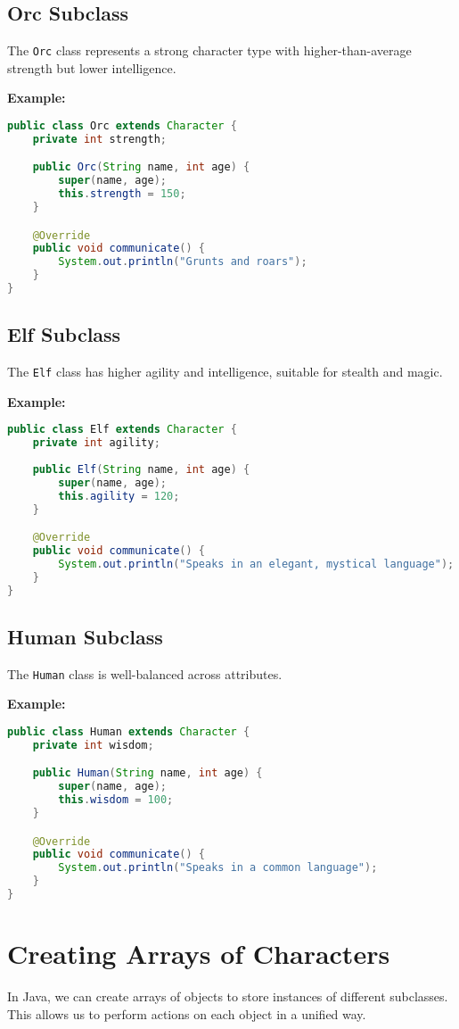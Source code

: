\documentclass{article}
\begin{document}
\subsection{Orc Subclass}
The \texttt{Orc} class represents a strong character type with higher-than-average strength but lower intelligence.

\textbf{Example:}
\begin{lstlisting}[language=Java]
public class Orc extends Character {
    private int strength;

    public Orc(String name, int age) {
        super(name, age);
        this.strength = 150;
    }

    @Override
    public void communicate() {
        System.out.println("Grunts and roars");
    }
}
\end{lstlisting}

\subsection{Elf Subclass}
The \texttt{Elf} class has higher agility and intelligence, suitable for stealth and magic.

\textbf{Example:}
\begin{lstlisting}[language=Java]
public class Elf extends Character {
    private int agility;
    
    public Elf(String name, int age) {
        super(name, age);
        this.agility = 120;
    }

    @Override
    public void communicate() {
        System.out.println("Speaks in an elegant, mystical language");
    }
}
\end{lstlisting}

\subsection{Human Subclass}
The \texttt{Human} class is well-balanced across attributes.

\textbf{Example:}
\begin{lstlisting}[language=Java]
public class Human extends Character {
    private int wisdom;

    public Human(String name, int age) {
        super(name, age);
        this.wisdom = 100;
    }

    @Override
    public void communicate() {
        System.out.println("Speaks in a common language");
    }
}
\end{lstlisting}

\section{Creating Arrays of Characters}
In Java, we can create arrays of objects to store instances of different subclasses. This allows us to perform actions on each object in a unified way.
\end{document}
